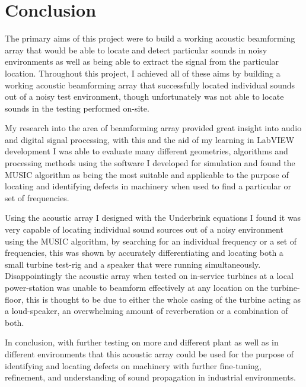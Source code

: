 \documentclass{UoNMCHA}
\numberwithin{equation}{section}
\begin{document}
\newpage
\section{Conclusion} \label{sec:Conclusion}
    
    The primary aims of this project were to build a working acoustic beamforming array that would be able to locate and detect particular sounds in noisy environments as well as being able to extract the signal from the particular location. Throughout this project, I achieved all of these aims by building a working acoustic beamforming array that successfully located individual sounds out of a noisy test environment, though unfortunately was not able to locate sounds in the testing performed on-site. 
    
    My research into the area of beamforming array provided great insight into audio and digital signal processing, with this and the aid of my learning in LabVIEW development I was able to evaluate many different geometries,  algorithms and processing methods using the software I developed for simulation and found the MUSIC algorithm as being the most suitable and applicable to the purpose of locating and identifying defects in machinery when used to find a particular or set of frequencies.
    
    Using the acoustic array I designed with the Underbrink equations I found it was very capable of locating individual sound sources out of a noisy environment using the MUSIC algorithm, by searching for an individual frequency or a set of frequencies, this was shown by accurately differentiating and locating both a small turbine test-rig and a speaker that were running simultaneously. Disappointingly the acoustic array when tested on in-service turbines at a local power-station was unable to beamform effectively at any location on the turbine-floor, this is thought to be due to either the whole casing of the turbine acting as a loud-speaker, an overwhelming amount of reverberation or a combination of both.
    
    In conclusion, with further testing on more and different plant as well as in different environments that this acoustic array could be used for the purpose of identifying and locating defects on machinery with further fine-tuning, refinement, and understanding of sound propagation in industrial environments.
\newpage

\end{document}

